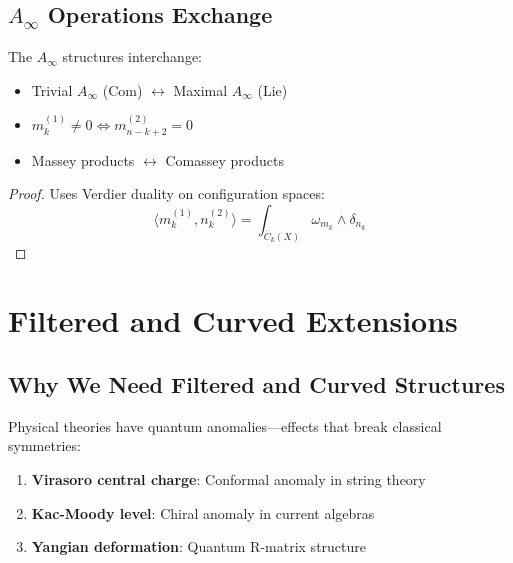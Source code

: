 \subsection{$A_\infty$ Operations Exchange}

\begin{theorem}
The $A_\infty$ structures interchange:
\begin{itemize}
\item Trivial $A_\infty$ (Com) $\leftrightarrow$ Maximal $A_\infty$ (Lie)
\item $m_k^{(1)} \neq 0 \Leftrightarrow m_{n-k+2}^{(2)} = 0$
\item Massey products $\leftrightarrow$ Comassey products
\end{itemize}
\end{theorem}

\begin{proof}
Uses Verdier duality on configuration spaces:
$$\langle m_k^{(1)}, n_k^{(2)} \rangle = \int_{\overline{C}_k(X)} \omega_{m_k} \wedge \delta_{n_k}$$
\end{proof}


\section{Filtered and Curved Extensions}

\subsection{Why We Need Filtered and Curved Structures}

Physical theories have quantum anomalies—effects that break classical symmetries:

\begin{example}
\begin{enumerate}
\item \textbf{Virasoro central charge}: Conformal anomaly in string theory
\item \textbf{Kac-Moody level}: Chiral anomaly in current algebras  
\item \textbf{Yangian deformation}: Quantum R-matrix structure
\end{enumerate}
\end{example}

